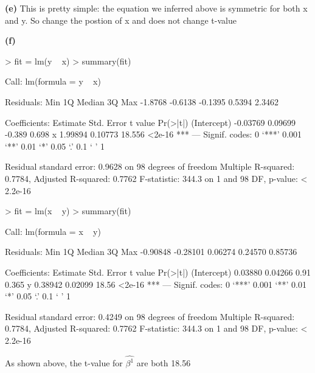 \documentclass[a4paper]{article}
\renewcommand{\part}[1] {\vspace{.10in} {\bf (#1)}}
\begin{document}
\part{e}
{\color{red}
This is pretty simple: the equation we inferred above is symmetric for both x and y. So change the postion of x and does not change t-value}

\part{f}
\begin{Schunk}
\begin{Sinput}
> fit = lm(y ~ x)
> summary(fit)
\end{Sinput}
\begin{Soutput}
Call:
lm(formula = y ~ x)

Residuals:
    Min      1Q  Median      3Q     Max 
-1.8768 -0.6138 -0.1395  0.5394  2.3462 

Coefficients:
            Estimate Std. Error t value Pr(>|t|)    
(Intercept) -0.03769    0.09699  -0.389    0.698    
x            1.99894    0.10773  18.556   <2e-16 ***
---
Signif. codes:  0 ‘***’ 0.001 ‘**’ 0.01 ‘*’ 0.05 ‘.’ 0.1 ‘ ’ 1

Residual standard error: 0.9628 on 98 degrees of freedom
Multiple R-squared:  0.7784,	Adjusted R-squared:  0.7762 
F-statistic: 344.3 on 1 and 98 DF,  p-value: < 2.2e-16
\end{Soutput}
\begin{Sinput}
> fit = lm(x ~ y)
> summary(fit)
\end{Sinput}
\begin{Soutput}
Call:
lm(formula = x ~ y)

Residuals:
     Min       1Q   Median       3Q      Max 
-0.90848 -0.28101  0.06274  0.24570  0.85736 

Coefficients:
            Estimate Std. Error t value Pr(>|t|)    
(Intercept)  0.03880    0.04266    0.91    0.365    
y            0.38942    0.02099   18.56   <2e-16 ***
---
Signif. codes:  0 ‘***’ 0.001 ‘**’ 0.01 ‘*’ 0.05 ‘.’ 0.1 ‘ ’ 1

Residual standard error: 0.4249 on 98 degrees of freedom
Multiple R-squared:  0.7784,	Adjusted R-squared:  0.7762 
F-statistic: 344.3 on 1 and 98 DF,  p-value: < 2.2e-16
\end{Soutput}
\end{Schunk}

{\color{red}
As shown above, the t-value for $\hat{\beta^1}$ are both 18.56
}
\end{document}

